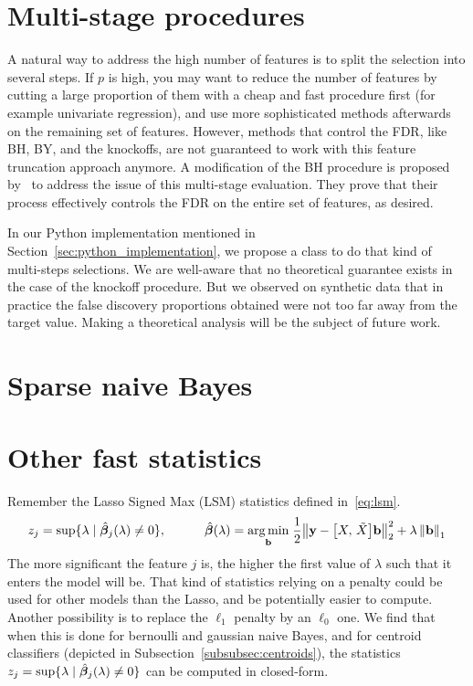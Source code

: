 \section{Multi-stage procedures}\label{sec:multi_stage}

A natural way to address the high number of features is to split the selection into several steps.
If $p$ is high,
you may want to reduce the number of features by cutting
a large proportion of them with a cheap and fast procedure first
(for example univariate regression),
and use more sophisticated methods afterwards on the remaining set of features.
However, methods that control the FDR, like BH, BY, and the knockoffs, are not guaranteed to work with this
feature truncation approach anymore.
A modification of the BH procedure is proposed by~\cite{multi_stage_fdr}
to address the issue of this multi-stage evaluation.
They prove that their process effectively controls the FDR on the entire set of features, as desired.

In our Python implementation mentioned in Section~\ref{sec:python_implementation},
we propose a  class to do that kind of multi-steps selections.
We are well-aware that no theoretical guarantee exists in the case of the knockoff procedure.
But we observed on synthetic data that in practice the false discovery proportions obtained
were not too far away from the target value.
Making a theoretical analysis will be the subject of future work.

\section{Sparse naive Bayes}\label{sec:snb}



\section{Other fast statistics}\label{sec:other_fast_statistics}

Remember the Lasso Signed Max (LSM) statistics defined in~\ref{eq:lsm}.
\begin{equation}\label{eq:lsm}
    z_j = \sup\{\lambda \mid \hat{\bm{\beta}}_j(\lambda) \neq 0\}
    ,\qquad\quad
    \hat{\bm{\beta}}(\lambda) =
        \underset{\mathbf{b}}{\operatorname*{arg\,min}}\;
        \frac{1}{2}\big\lVert \mathbf{y} - \big[ X,\, \tilde{X} \big]\mathbf{b} \big\rVert_2^2 + \lambda\left\lVert\mathbf{b}\right\rVert_1
\end{equation}
The more significant the feature $j$ is,
the higher the first value of $\lambda$ such that it enters the model will be.
That kind of statistics relying on a penalty could be used for other models than the Lasso,
and be potentially easier to compute.
Another possibility is to replace the $\ell_1$ penalty by an $\ell_0$ one.
We find that when this is done for bernoulli and gaussian naive Bayes,
and for centroid classifiers (depicted in Subsection~\ref{subsubsec:centroids}),
the statistics $z_j = \sup\{\lambda \mid \hat{\bm{\beta}}_j(\lambda) \neq 0\}$
can be computed in closed-form.

